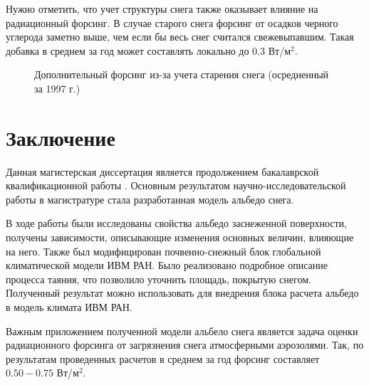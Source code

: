 \documentclass[a4paper, fontsize=14pt]{scrartcl}
\begin{document}
Нужно отметить, что учет структуры снега также оказывает влияние на радиационный форсинг. В случае старого снега форсинг от осадков черного углерода заметно выше, чем если бы весь снег считался свежевыпавшим. Такая добавка в среднем за год может составлять локально до $0.3$ Вт/м$^2$. 

\begin{figure}[h]
    \caption{Дополнительный форсинг из-за учета старения снега (осредненный за 1997 г.)}
    \label{fig:image}
\end{figure}


\newpage
\section*{Заключение}

Данная магистерская диссертация является продолжением бакалаврской квалификационной работы \cite{Bak2019}. Основным результатом научно-исследовательской работы в магистратуре стала разработанная модель альбедо снега. 

В ходе работы были исследованы свойства альбедо заснеженной поверхности, получены зависимости, описывающие изменения основных величин, влияющие на него. Также был модифицирован почвенно-снежный блок глобальной климатической модели ИВМ РАН. Было реализовано подробное описание процесса таяния, что позволило уточнить площадь, покрытую снегом. Полученный результат можно использовать для внедрения блока расчета альбедо в модель климата ИВМ РАН. 

Важным приложением полученной модели альбело снега является задача оценки радиационного форсинга от загрязнения снега атмосферными аэрозолями. Так, по результатам проведенных расчетов в среднем за год форсинг составляет $0.50 - 0.75$ Вт/м$^2$.




\newpage
{}
{}


\end{document}
